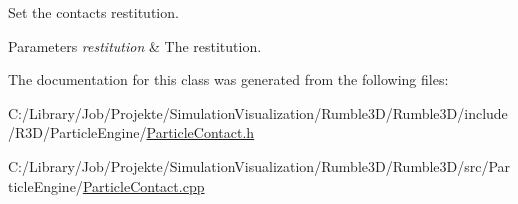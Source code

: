 Set the contact\textquotesingle{}s restitution. 


\begin{DoxyParams}{Parameters}
{\em restitution} & The restitution. \\
\hline
\end{DoxyParams}


The documentation for this class was generated from the following files\+:\begin{DoxyCompactItemize}
\item 
C\+:/\+Library/\+Job/\+Projekte/\+Simulation\+Visualization/\+Rumble3\+D/\+Rumble3\+D/include/\+R3\+D/\+Particle\+Engine/\mbox{\hyperlink{_particle_contact_8h}{Particle\+Contact.\+h}}\item 
C\+:/\+Library/\+Job/\+Projekte/\+Simulation\+Visualization/\+Rumble3\+D/\+Rumble3\+D/src/\+Particle\+Engine/\mbox{\hyperlink{_particle_contact_8cpp}{Particle\+Contact.\+cpp}}\end{DoxyCompactItemize}
